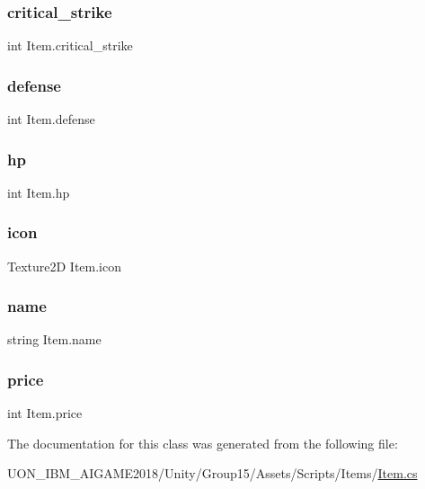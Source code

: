 \subsubsection{\texorpdfstring{critical\_strike}{critical\_strike}}
{\footnotesize\ttfamily int Item.\+critical\+\_\+strike}

\mbox{\label{class_item_af408dfdaffd7c3e1920615c9ad124079}} 
\subsubsection{\texorpdfstring{defense}{defense}}
{\footnotesize\ttfamily int Item.\+defense}

\mbox{\label{class_item_a8ac358b3db5252f0f4cef2422e301fe4}} 
\subsubsection{\texorpdfstring{hp}{hp}}
{\footnotesize\ttfamily int Item.\+hp}

\mbox{\label{class_item_aa27b80bec704f77f3b1a5f00ff9120ea}} 
\subsubsection{\texorpdfstring{icon}{icon}}
{\footnotesize\ttfamily Texture2D Item.\+icon}

\mbox{\label{class_item_a86a80b030e63ac2d31f3576ed8d1be51}} 
\subsubsection{\texorpdfstring{name}{name}}
{\footnotesize\ttfamily string Item.\+name}

\mbox{\label{class_item_a371a0aed2415a1b8adf020707a38ab76}} 
\subsubsection{\texorpdfstring{price}{price}}
{\footnotesize\ttfamily int Item.\+price}



The documentation for this class was generated from the following file\+:\begin{DoxyCompactItemize}
\item 
U\+O\+N\+\_\+\+I\+B\+M\+\_\+\+A\+I\+G\+A\+M\+E2018/\+Unity/\+Group15/\+Assets/\+Scripts/\+Items/\mbox{\hyperlink{_item_8cs}{Item.\+cs}}\end{DoxyCompactItemize}
